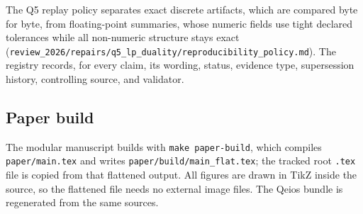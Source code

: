 The Q5 replay policy separates exact discrete artifacts, which are compared byte for byte, from floating-point
summaries, whose numeric fields use tight declared tolerances while all non-numeric structure stays exact
(\nolinkurl{review_2026/repairs/q5_lp_duality/reproducibility_policy.md}). The registry records, for every claim, its
wording, status, evidence type, supersession history, controlling source, and validator.

\subsection{Paper build}

The modular manuscript builds with \texttt{make paper-build}, which compiles \nolinkurl{paper/main.tex} and writes
\nolinkurl{paper/build/main_flat.tex}; the tracked root \texttt{.tex} file is copied from that flattened output. All
figures are drawn in TikZ inside the source, so the flattened file needs no external image files. The Qeios bundle is
regenerated from the same sources.
